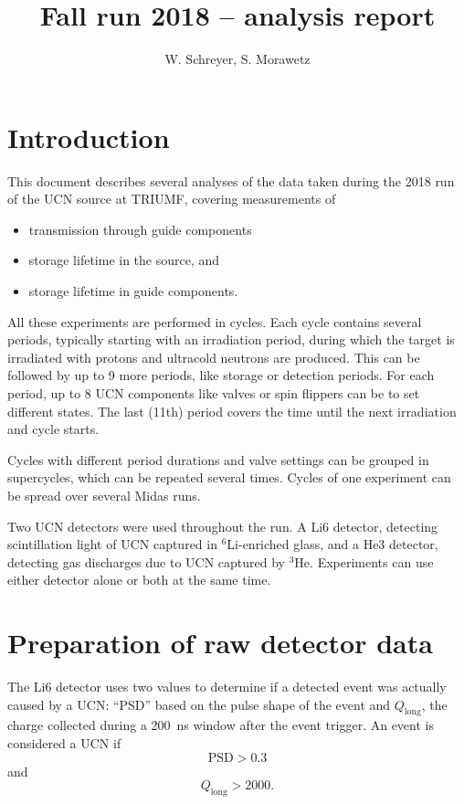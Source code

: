 \documentclass[10pt,letterpaper]{article}
\author{W. Schreyer, S. Morawetz}
\title{Fall run 2018 -- analysis report}
\begin{document}
\maketitle

\tableofcontents

\section{Introduction}

This document describes several analyses of the data taken during the 2018 run of the UCN source at TRIUMF, covering measurements of
\begin{itemize}
\item transmission through guide components
\item storage lifetime in the source, and
\item storage lifetime in guide components.
\end{itemize}

All these experiments are performed in cycles. Each cycle contains several periods, typically starting with an irradiation period, during which the target is irradiated with protons and ultracold neutrons are produced. This can be followed by up to 9 more periods, like storage or detection periods. For each period, up to 8 UCN components like valves or spin flippers can be to set different states. The last (11th) period covers the time until the next irradiation and cycle starts.

Cycles with different period durations and valve settings can be grouped in supercycles, which can be repeated several times. Cycles of one experiment can be spread over several Midas runs.

Two UCN detectors were used throughout the run. A Li6 detector, detecting scintillation light of UCN captured in $^6$Li-enriched glass, and a He3 detector, detecting gas discharges due to UCN captured by $^3$He. Experiments can use either detector alone or both at the same time.


\section{Preparation of raw detector data}

The Li6 detector uses two values to determine if a detected event was actually caused by a UCN: ``PSD'' based on the pulse shape of the event and $Q_\mathrm{long}$, the charge collected during a \SI{200}{\nano\second} window after the event trigger. An event is considered a UCN if
\begin{equation}
\mathrm{PSD} > 0.3
\end{equation}
and
\begin{equation}
Q_\mathrm{long} > 2000.
\end{equation}
\end{document}
